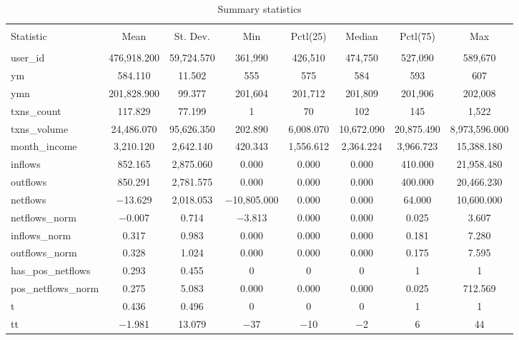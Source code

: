 
\begin{table}[!htbp] \centering 
  \caption{Summary statistics} 
  \label{tab:sumstats} 
\scriptsize 
\begin{tabular}{@{\extracolsep{5pt}}lccccccc} 
\\[-1.8ex]\hline 
\hline \\[-1.8ex] 
Statistic & \multicolumn{1}{c}{Mean} & \multicolumn{1}{c}{St. Dev.} & \multicolumn{1}{c}{Min} & \multicolumn{1}{c}{Pctl(25)} & \multicolumn{1}{c}{Median} & \multicolumn{1}{c}{Pctl(75)} & \multicolumn{1}{c}{Max} \\ 
\hline \\[-1.8ex] 
user\_id & 476,918.200 & 59,724.570 & 361,990 & 426,510 & 474,750 & 527,090 & 589,670 \\ 
ym & 584.110 & 11.502 & 555 & 575 & 584 & 593 & 607 \\ 
ymn & 201,828.900 & 99.377 & 201,604 & 201,712 & 201,809 & 201,906 & 202,008 \\ 
txns\_count & 117.829 & 77.199 & 1 & 70 & 102 & 145 & 1,522 \\ 
txns\_volume & 24,486.070 & 95,626.350 & 202.890 & 6,008.070 & 10,672.090 & 20,875.490 & 8,973,596.000 \\ 
month\_income & 3,210.120 & 2,642.140 & 420.343 & 1,556.612 & 2,364.224 & 3,966.723 & 15,388.180 \\ 
inflows & 852.165 & 2,875.060 & 0.000 & 0.000 & 0.000 & 410.000 & 21,958.480 \\ 
outflows & 850.291 & 2,781.575 & 0.000 & 0.000 & 0.000 & 400.000 & 20,466.230 \\ 
netflows & $-$13.629 & 2,018.053 & $-$10,805.000 & 0.000 & 0.000 & 64.000 & 10,600.000 \\ 
netflows\_norm & $-$0.007 & 0.714 & $-$3.813 & 0.000 & 0.000 & 0.025 & 3.607 \\ 
inflows\_norm & 0.317 & 0.983 & 0.000 & 0.000 & 0.000 & 0.181 & 7.280 \\ 
outflows\_norm & 0.328 & 1.024 & 0.000 & 0.000 & 0.000 & 0.175 & 7.595 \\ 
has\_pos\_netflows & 0.293 & 0.455 & 0 & 0 & 0 & 1 & 1 \\ 
pos\_netflows\_norm & 0.275 & 5.083 & 0.000 & 0.000 & 0.000 & 0.025 & 712.569 \\ 
t & 0.436 & 0.496 & 0 & 0 & 0 & 1 & 1 \\ 
tt & $-$1.981 & 13.079 & $-$37 & $-$10 & $-$2 & 6 & 44 \\ 

\end{tabular}
\end{table}
